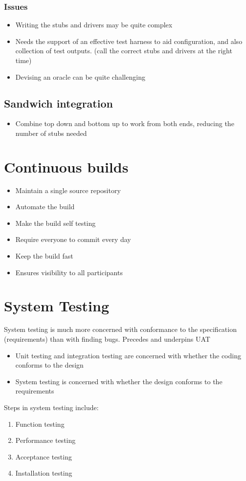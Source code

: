 \documentclass{article}[18pt]
\begin{document}
\subsubsection{Issues}
\begin{itemize}
	\item Writing the stubs and drivers may be quite complex
	\item Needs the support of an effective test harness to aid configuration, and also collection of test outputs. (call the correct stubs and drivers at the right time)
	\item Devising an oracle can be quite challenging
\end{itemize}
\subsection{Sandwich integration}
\begin{itemize}
	\item Combine top down and bottom up to work from both ends, reducing the number of stubs needed
\end{itemize}
\section{Continuous builds}
\begin{itemize}
	\item Maintain a single source repository
	\item Automate the build
	\item Make the build self testing
	\item Require everyone to commit every day
	\item Keep the build fast
	\item Ensures visibility to all participants
\end{itemize}
\section{System Testing}
System testing is much more concerned with conformance to the specification (requirements) than with finding bugs. Precedes and underpins UAT
\begin{itemize}
	\item Unit testing and integration testing are concerned with whether the coding conforms to the design
	\item System testing is concerned with whether the design conforms to the requirements
\end{itemize}
Steps in system testing include:
\begin{enumerate}
	\item Function testing
	\item Performance testing
	\item Acceptance testing
	\item Installation testing
\end{enumerate}
\end{document}
